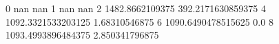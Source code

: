 0 nan nan
1 nan nan
2 1482.8662109375 392.2171630859375
4 1092.3321533203125 1.68310546875
6 1090.6490478515625 0.0
8 1093.4993896484375 2.850341796875
